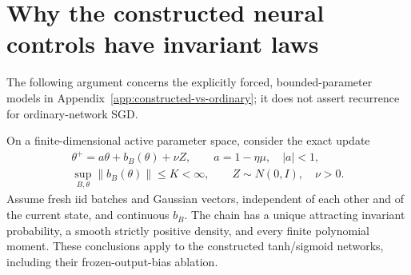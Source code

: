 \section{Why the constructed neural controls have invariant laws}
\label{app:bounded-network-proof}
The following argument concerns the explicitly forced, bounded-parameter
models in Appendix~\ref{app:constructed-vs-ordinary}; it does not assert
recurrence for ordinary-network SGD.

\begin{proposition}
\label{prop:bounded-network-recurrence}
On a finite-dimensional active parameter space, consider the exact update
\[
 \begin{gathered}
 \theta^+=a\theta+b_B(\theta)+\nu Z,\qquad
 a=1-\eta\mu,\quad |a|<1,\\
 \sup_{B,\theta}\|b_B(\theta)\|\le K<\infty,
 \qquad Z\sim N(0,I),\quad\nu>0.
 \end{gathered}
\]
Assume fresh iid batches and Gaussian vectors, independent of each other
and of the current state, and continuous $b_B$.
The chain has a unique attracting invariant probability, a smooth
strictly positive density, and every finite polynomial moment.
These conclusions apply to the constructed tanh/sigmoid networks,
including their frozen-output-bias ablation.
\end{proposition}

